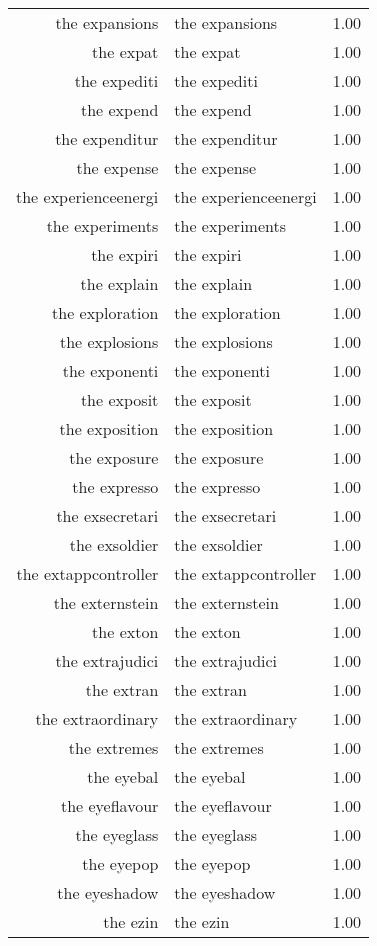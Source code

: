 \begin{table}[ht]
\begin{tabular}{rlr}
  the expansions & the expansions & 1.00 \\ 
  the expat & the expat & 1.00 \\ 
  the expediti & the expediti & 1.00 \\ 
  the expend & the expend & 1.00 \\ 
  the expenditur & the expenditur & 1.00 \\ 
  the expense & the expense & 1.00 \\ 
  the experienceenergi & the experienceenergi & 1.00 \\ 
  the experiments & the experiments & 1.00 \\ 
  the expiri & the expiri & 1.00 \\ 
  the explain & the explain & 1.00 \\ 
  the exploration & the exploration & 1.00 \\ 
  the explosions & the explosions & 1.00 \\ 
  the exponenti & the exponenti & 1.00 \\ 
  the exposit & the exposit & 1.00 \\ 
  the exposition & the exposition & 1.00 \\ 
  the exposure & the exposure & 1.00 \\ 
  the expresso & the expresso & 1.00 \\ 
  the exsecretari & the exsecretari & 1.00 \\ 
  the exsoldier & the exsoldier & 1.00 \\ 
  the extappcontroller & the extappcontroller & 1.00 \\ 
  the externstein & the externstein & 1.00 \\ 
  the exton & the exton & 1.00 \\ 
  the extrajudici & the extrajudici & 1.00 \\ 
  the extran & the extran & 1.00 \\ 
  the extraordinary & the extraordinary & 1.00 \\ 
  the extremes & the extremes & 1.00 \\ 
  the eyebal & the eyebal & 1.00 \\ 
  the eyeflavour & the eyeflavour & 1.00 \\ 
  the eyeglass & the eyeglass & 1.00 \\ 
  the eyepop & the eyepop & 1.00 \\ 
  the eyeshadow & the eyeshadow & 1.00 \\ 
  the ezin & the ezin & 1.00 \\ 

\end{tabular}
\end{table}
